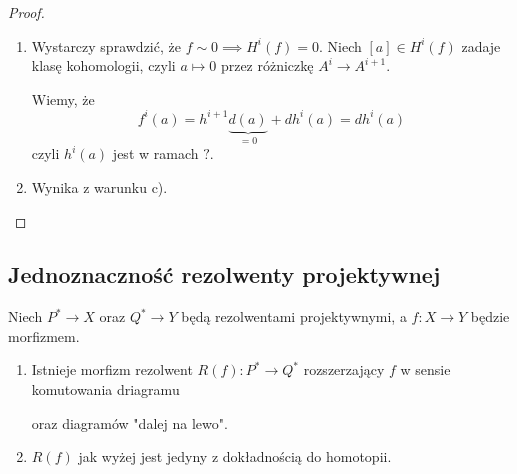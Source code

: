 \begin{proof}
\begin{enumerate}[label=(\alph*)]
    \item Wystarczy sprawdzić, że $f\sim 0\implies H^i(f)=0$. Niech $[a]\in H^i(f)$ zadaje klasę kohomologii, czyli $a\mapsto 0$ przez różniczkę $A^i\to A^{i+1}$.
      \begin{center}
      \end{center}
      Wiemy, że 
      $$f^i(a)=h^{i+1}\underbrace{d(a)}_{=0}+dh^i(a)=dh^i(a)$$
      czyli $h^i(a)$ jest w ramach $?$.
    \item Wynika z warunku c).
  \end{enumerate}
\end{proof}

\subsection{Jednoznaczność rezolwenty projektywnej}

\begin{fact}
  Niech $P^*\to X$ oraz $Q^*\to Y$ będą rezolwentami projektywnymi, a $f:X\to Y$ będzie morfizmem.
  \begin{enumerate}
    \item Istnieje morfizm rezolwent $R(f):P^*\to Q^*$ rozszerzający $f$ w sensie komutowania driagramu
      \begin{center}\end{center}
      oraz diagramów "dalej na lewo".
    \item $R(f)$ jak wyżej jest jedyny z dokładnością do homotopii.
  \end{enumerate}
\end{fact}

